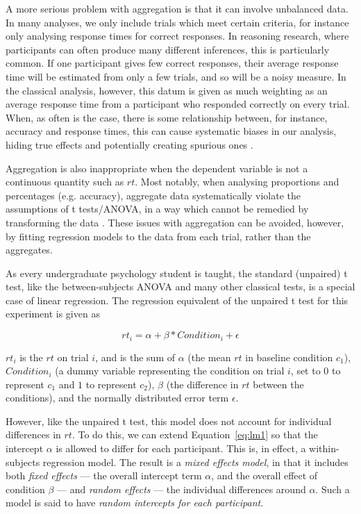 A more serious problem with aggregation
is that it can involve unbalanced data.
In many analyses, we only include trials which meet certain criteria,
for instance only analysing response times for correct responses.
In reasoning research, where participants can often produce many different inferences,
this is particularly common.
If one participant gives few correct responses,
their average response time will be estimated from only a few trials,
and so will be a noisy measure.
In the classical analysis, however,
this datum is given as much weighting
as an average response time from a participant
who responded correctly on every trial.
When, as often is the case, there is some relationship between,
for instance, accuracy and response times,
this can cause systematic biases in our analysis,
hiding true effects and potentially creating spurious ones \citep{Baayen2008}.

Aggregation is also inappropriate
when the dependent variable is not a continuous quantity such as $rt$.
Most notably, when analysing proportions and percentages (e.g. accuracy),
aggregate data systematically violate the assumptions of t tests/ANOVA,
in a way which cannot be remedied by transforming the data \citep{Warton2010}.
These issues with aggregation can be avoided, however,
by fitting regression models to the data from each trial, rather than the aggregates.

As every undergraduate psychology student is taught,
the standard (unpaired) t test,
like the between-subjects ANOVA and many other classical tests,
is a special case of linear regression.
The regression equivalent of the unpaired t test for this experiment is given as

\begin{equation}
  \label{eq:lm1}
  rt_i = \alpha + \beta * Condition_i + \epsilon
\end{equation}

$rt_i$ is the $rt$ on trial $i$, and is the sum of
$\alpha$ (the mean $rt$ in baseline condition $c_1$),
$Condition_i$ (a dummy variable representing the condition on trial $i$,
set to $0$ to represent $c_1$ and $1$ to represent $c_2$),
$\beta$ (the difference in $rt$ between the conditions),
and the normally distributed error term $\epsilon$.

However, like the unpaired t test,
this model does not account for individual differences in $rt$.
To do this, we can extend Equation~\ref{eq:lm1}
so that the intercept $\alpha$ is allowed to differ for each participant.
This is, in effect, a within-subjects regression model.
The result is a \emph{mixed effects model},
in that it includes both \emph{fixed effects} ---
the overall intercept term $\alpha$,
and the overall effect of condition $\beta$ ---
and \emph{random effects} ---
the individual differences around $\alpha$.
Such a model is said to have \emph{random intercepts for each participant}.

